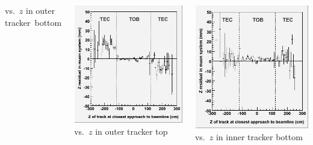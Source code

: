 \documentclass[compress]{beamer}
\begin{document}
\begin{frame}
\vspace{0.2 cm}
\begin{columns}
\scriptsize vs.\ $z$ in outer \mbox{tracker bottom\hspace{-1 cm}}

\includegraphics[width=\linewidth]{zresid_from_tracker_outerbottom.png}
\scriptsize vs.\ $z$ in outer tracker top

\includegraphics[width=\linewidth]{zresid_from_tracker_outertop.png}
\scriptsize vs.\ $z$ in inner tracker bottom


\end{columns}
\end{frame}
\end{document}
